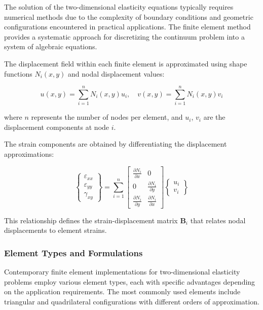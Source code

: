 \documentclass[12pt,a4paper]{report}
\begin{document}
The solution of the two-dimensional elasticity equations typically requires numerical methods due to the complexity of boundary conditions and geometric configurations encountered in practical applications. The finite element method provides a systematic approach for discretizing the continuum problem into a system of algebraic equations.

The displacement field within each finite element is approximated using shape functions $N_i(x,y)$ and nodal displacement values:

\begin{equation}
u(x,y) = \sum_{i=1}^{n} N_i(x,y) u_i, \quad
v(x,y) = \sum_{i=1}^{n} N_i(x,y) v_i
\end{equation}

where $n$ represents the number of nodes per element, and $u_i$, $v_i$ are the displacement components at node $i$.

The strain components are obtained by differentiating the displacement approximations:

\begin{equation}
\begin{Bmatrix} 
\varepsilon_{xx} \\ 
\varepsilon_{yy} \\ 
\gamma_{xy} 
\end{Bmatrix} 
= \sum_{i=1}^{n} 
\begin{bmatrix} 
\frac{\partial N_i}{\partial x} & 0 \\ 
0 & \frac{\partial N_i}{\partial y} \\ 
\frac{\partial N_i}{\partial y} & \frac{\partial N_i}{\partial x} 
\end{bmatrix} 
\begin{Bmatrix} 
u_i \\ 
v_i 
\end{Bmatrix}
\end{equation}

This relationship defines the strain-displacement matrix $\mathbf{B}_i$ that relates nodal displacements to element strains.

\subsubsection{Element Types and Formulations}

Contemporary finite element implementations for two-dimensional elasticity problems employ various element types, each with specific advantages depending on the application requirements. The most commonly used elements include triangular and quadrilateral configurations with different orders of approximation.
\end{document}
